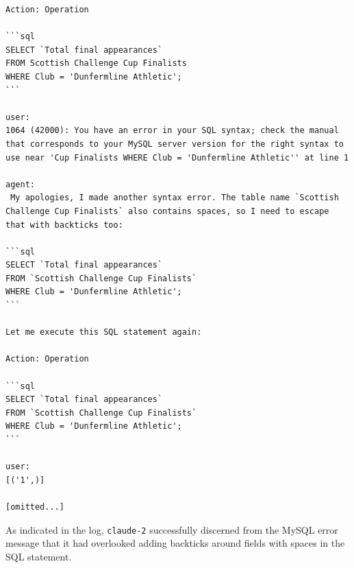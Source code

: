 \begin{lstlisting}
Action: Operation

```sql
SELECT `Total final appearances`
FROM Scottish Challenge Cup Finalists
WHERE Club = 'Dunfermline Athletic';
```

user:
1064 (42000): You have an error in your SQL syntax; check the manual that corresponds to your MySQL server version for the right syntax to use near 'Cup Finalists WHERE Club = 'Dunfermline Athletic'' at line 1

agent:
 My apologies, I made another syntax error. The table name `Scottish Challenge Cup Finalists` also contains spaces, so I need to escape that with backticks too:

```sql
SELECT `Total final appearances`
FROM `Scottish Challenge Cup Finalists` 
WHERE Club = 'Dunfermline Athletic';
```

Let me execute this SQL statement again:

Action: Operation

```sql  
SELECT `Total final appearances`
FROM `Scottish Challenge Cup Finalists`
WHERE Club = 'Dunfermline Athletic';
```

user:
[('1',)]

[omitted...]
\end{lstlisting}

As indicated in the log, \texttt{claude-2} successfully discerned from the MySQL error message that it had overlooked adding backticks around fields with spaces in the SQL statement.


